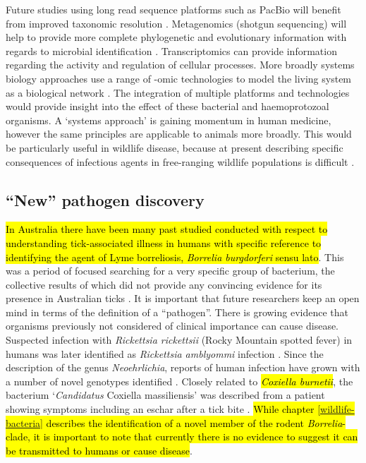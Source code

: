 \documentclass[a4paper, nobind]{templates/ociamthesis}
\begin{document}
Future studies using long read sequence platforms such as PacBio will benefit from improved taxonomic resolution \autocite{jamyLongReadMetabarcoding2020}.
Metagenomics (shotgun sequencing) will help to provide more complete phylogenetic and evolutionary information with regards to microbial identification \autocite{razzautiComparisonTranscriptomeSequencing2015}.
Transcriptomics can provide information regarding the activity and regulation of cellular processes.
More broadly systems biology approaches use a range of -omic technologies to model the living system as a biological network \autocite{eckhardtSystemsApproachInfectious2020}.
The integration of multiple platforms and technologies would provide insight into the effect of these bacterial and haemoprotozoal organisms.
A `systems approach' is gaining momentum in human medicine, however the same principles are applicable to animals more broadly.
This would be particularly useful in wildlife disease, because at present describing specific consequences of infectious agents in free-ranging wildlife populations is difficult \autocite{austenInvestigationMorphologicalDiversity2015,goftonNovelEhrlichiaSpecies2018,northoverIncreasedTrypanosomaSpp2019}.

\hypertarget{new-pathogen-discovery}{%
\subsection{``New'' pathogen discovery}\label{new-pathogen-discovery}}

\hl{In Australia there have been many past studied conducted with respect to understanding tick-associated illness in humans with specific reference to identifying the agent of Lyme borreliosis, \emph{Borrelia burgdorferi} sensu lato}.
This was a period of focused searching for a very specific group of bacterium, the collective results of which did not provide any convincing evidence for its presence in Australian ticks \autocite{chaladaThereLymelikeDisease2016}.
It is important that future researchers keep an open mind in terms of the definition of a ``pathogen''.
There is growing evidence that organisms previously not considered of clinical importance can cause disease.
Suspected infection with \emph{Rickettsia rickettsii} (Rocky Mountain spotted fever) in humans was later identified as \emph{Rickettsia amblyommi} infection \autocite{appersonTickBorneDiseasesNorth2008}.
Since the description of the genus \emph{Neoehrlichia}, reports of human infection have grown with a number of novel genotypes identified \autocite{wassCultivationCausativeAgent2019}.
Closely related to \hl{\emph{Coxiella burnetii}}, the bacterium `\emph{Candidatus} Coxiella massiliensis' was described from a patient showing symptoms including an eschar after a tick bite \autocite{angelakisCandidatusCoxiellaMassiliensis2016}.
\hl{While chapter \ref{wildlife-bacteria} describes the identification of a novel member of the rodent \emph{Borrelia}-clade, it is important to note that currently there is no evidence to suggest it can be transmitted to humans or cause disease}.
\end{document}
